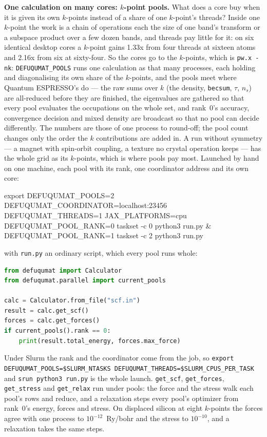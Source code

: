 \documentclass[11pt,a4paper]{article}
\newcommand{\qe}{Quantum ESPRESSO}
\newcommand{\code}[1]{\texttt{\small #1}}
\begin{document}
\textbf{One calculation on many cores: $k$-point pools.} What does a core buy
when it is given its own $k$-points instead of a share of one $k$-point's
threads? Inside one $k$-point the work is a chain of operations each the size of
one band's transform or a subspace product over a few dozen bands, and threads
pay little for it: on six identical desktop cores a $k$-point gains 1.33x from
four threads at sixteen atoms and 2.16x from six at sixty-four. So the cores go
to the $k$-points, which is \code{pw.x -nk}: \code{DEFUQUMAT\_POOLS} runs one
calculation as that many processes, each holding and diagonalising its own
share of the $k$-points, and the pools meet where \qe's do --- the raw
sums over $k$ (the density, \code{becsum}, $\tau$, $n_s$) are all-reduced before
they are finished, the eigenvalues are gathered so that every pool evaluates the
occupations on the whole set, and rank~0's accuracy, convergence decision and
mixed density are broadcast so that no pool can decide differently. The numbers
are those of one process to round-off; the pool count changes only the order the
$k$ contributions are added in. A run without symmetry --- a magnet with
spin-orbit coupling, a texture no crystal operation keeps --- has the whole grid
as its $k$-points, which is where pools pay most. Launched by hand on one machine,
each pool with its rank, one coordinator address and its own core:

\begin{shcode}
export DEFUQUMAT_POOLS=2 DEFUQUMAT_COORDINATOR=localhost:23456 DEFUQUMAT_THREADS=1 JAX_PLATFORMS=cpu
DEFUQUMAT_POOL_RANK=0 taskset -c 0 python3 run.py &
DEFUQUMAT_POOL_RANK=1 taskset -c 2 python3 run.py
\end{shcode}

\noindent with \code{run.py} an ordinary script, which every pool runs whole:

\begin{lstlisting}[language=Python]
from defuqumat import Calculator
from defuqumat.parallel import current_pools

calc = Calculator.from_file("scf.in")
result = calc.get_scf()
forces = calc.get_forces()
if current_pools().rank == 0:
    print(result.total_energy, forces.max_force)
\end{lstlisting}

\noindent Under Slurm the rank and the coordinator come from the job, so
\code{export DEFUQUMAT\_POOLS=\$SLURM\_NTASKS DEFUQUMAT\_THREADS=\$SLURM\_CPUS\_PER\_TASK}
and \code{srun python3 run.py} is the whole launch. \code{get\_scf},
\code{get\_forces}, \code{get\_stress} and \code{get\_relax} run under pools: the
force and the stress walk each pool's rows and reduce, and a relaxation steps
every pool's optimizer from rank~0's energy, forces and stress. On displaced
silicon at eight $k$-points the forces agree with one process to
$10^{-12}$~Ry/bohr and the stress to $10^{-10}$, and a relaxation takes the same
steps.
\end{document}
